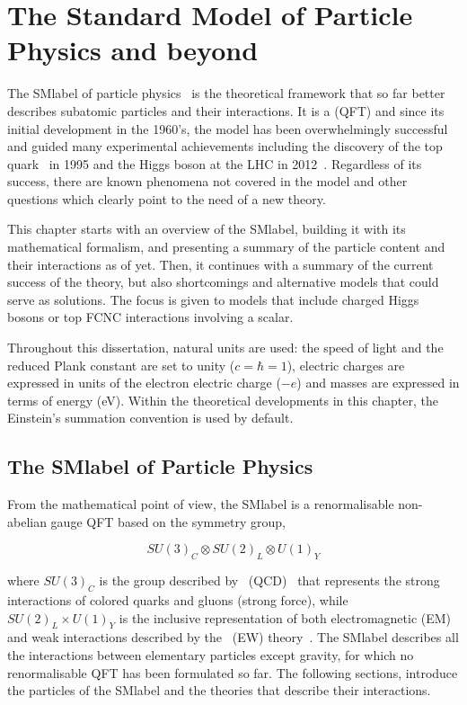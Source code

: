 \chapter{The Standard Model of Particle Physics and beyond}
\label{chapter:SM}

The \acrfull{SMlabel} of particle physics~\cite{PhysRevLett.19.1264,GLASHOW1961579,RevModPhys.52.525} is the theoretical framework
that so far better describes subatomic particles and their interactions.
It is a  (\acrshort{QFT}) and since its initial development in the 1960's,
the model has been overwhelmingly successful and guided many experimental achievements
including the discovery of the top quark~\cite{topsearch1995,PhysRevLett.74.2626} in 1995
and the Higgs boson at the LHC in 2012~\cite{ATLASHiggs2012,CMShiggs2012}.
Regardless of its success, there are known phenomena not covered in the model
and other questions which clearly point to the need of a new theory.

This chapter starts with an overview of the \acrshort{SMlabel}, building it with its mathematical formalism, and presenting a summary of the particle content and their interactions as of yet. Then, it continues with a summary of the current success of the theory, but also shortcomings and alternative models that could serve as solutions. The focus is given to models that include charged Higgs bosons or top FCNC interactions involving a scalar.

Throughout this dissertation, natural units are used: the speed of light and the reduced Plank constant are set to unity ($c=\hbar=1$),
electric charges are expressed in units of the electron electric charge ($-e$) and masses are expressed in terms of energy (eV).
Within the theoretical developments in this chapter, the Einstein's summation convention is used by default.

\section{The \acrlong{SMlabel} of Particle Physics}

From the mathematical point of view, the \acrshort{SMlabel} is a renormalisable non-abelian gauge \acrshort{QFT} based on the
symmetry group, 

\begin{equation}
    \label{Theory_eq:SMgroup}
    SU(3)_C\otimes SU(2)_L\otimes U(1)_Y
\end{equation}

where $SU(3)_C$ is the group described by ~(\acrshort{QCD})~\cite{QCD} that
represents the strong interactions of colored quarks and gluons (strong force),
while $SU(2)_L\times U(1)_Y$ is the inclusive representation of both electromagnetic (EM) and weak interactions
described by the ~(\acrshort{EW}) theory~\cite{PhysRevLett.19.1264,Salam:1968rm,GLASHOW1961579}. The \acrshort{SMlabel} describes all the interactions between elementary
particles except gravity, for which no renormalisable \acrshort{QFT} has been formulated so far.
The following sections, introduce the particles of the \acrshort{SMlabel} and the theories that describe their interactions.  

